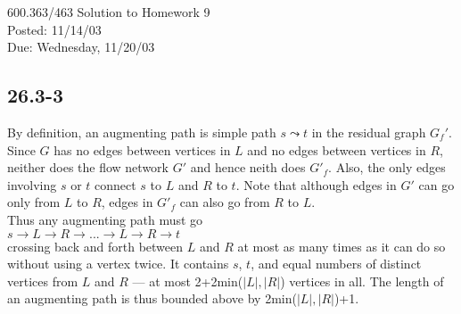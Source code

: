\documentclass{article}[12pt]
\begin{document}
\large
\begin{center} 
600.363/463 Solution to Homework 9\\
Posted: 11/14/03\\
Due: Wednesday, 11/20/03\\
\end{center}
\subsection*{26.3-3}
By definition, an augmenting path is simple path $s\leadsto t$ in the residual graph $G_f'$. Since $G$ has no edges between vertices in $L$ and no edges between vertices in $R$, neither does the flow network $G'$ and hence neith does $G'_f$. Also, the only edges involving $s$ or $t$ connect $s$ to $L$ and $R$ to $t$. Note that although edges in $G'$ can go only from $L$ to $R$, edges in $G'_f$ can also go from $R$ to $L$. \\
Thus any augmenting path must go\\
$s\rightarrow L\rightarrow R\rightarrow ... \rightarrow L \rightarrow R\rightarrow t$\\
crossing back and forth between $L$ and $R$ at most as many times as it can do so without using a vertex twice. It contains $s$, $t$, and equal numbers of distinct vertices from $L$ and $R$ --- at most 2+2min($|L|, |R|$) vertices in all. The length of an augmenting path is thus bounded above by 2min($|L|, |R|$)+1.
\end{document}
